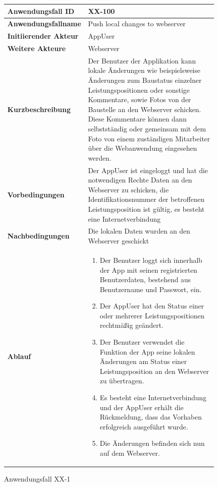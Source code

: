 \newpage

\begin{figure}[h]
	\centering
	\begin{tabularx}{\textwidth}{ X | X }
		\textbf{Anwendungsfall ID} & XX-100 \\ \hline
		\textbf{Anwendungsfallname} & Push local changes to webserver\\ \hline
		\textbf{Initiierender Akteur} & AppUser \\ \hline
		\textbf{Weitere Akteure} & Webserver  \\ \hline
		\textbf{Kurzbeschreibung} & Der Benutzer der Applikation kann lokale \"Anderungen wie beispielsweise \"Anderungen zum Baustatus einzelner Leistungspositionen oder sonstige Kommentare,  sowie Fotos von der Baustelle an den Webserver schicken.  Diese Kommentare k\"onnen dann selbstst\"andig oder gemeinsam mit dem Foto von einem zust\"andigen Mitarbeiter \"uber die Webanwendung eingesehen werden.  \\ \hline
		\textbf{Vorbedingungen} & Der AppUser ist eingeloggt und hat die notwendigen Rechte Daten an den Webserver zu schicken, die Identifikationsnummer der betroffenen Leistungsposition ist g\"ultig,  es besteht eine Internetverbindung   \\ \hline
		\textbf{Nachbedingungen} & Die lokalen Daten wurden an den Webserver geschickt\\ \hline
		\textbf{Ablauf} &
			\begin{enumerate}
				\item Der Benutzer loggt sich innerhalb der App mit seinen registrierten Benutzerdaten, bestehend aus Benutzername und Passwort,  ein.  
				\item Der AppUser hat den Status einer oder mehrerer Leistungspositionen rechtm\"a{\ss}ig ge\"andert.
				\item Der Benutzer verwendet die Funktion der App seine lokalen \"Anderungen am Status einer Leistungsposition an den Webserver zu \"ubertragen.
				\item Es besteht eine Internetverbindung und der AppUser erh\"alt die R\"uckmeldung,  dass das Vorhaben erfolgreich ausgef\"uhrt wurde.  
				\item Die \"Anderungen befinden sich nun auf dem Webserver.
			\end{enumerate}
			\end{tabularx}
	\caption{Anwendungsfall XX-1}
	\label{fig:anwendungsfall-app-tabelle-xx-1}
\end{figure}
